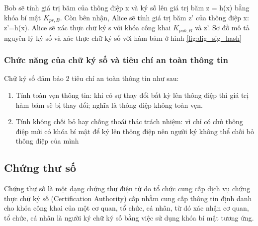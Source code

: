 Bob sẽ tính giá trị băm của thông điệp x và ký số lên giá trị băm z = h(x) bằng khóa bí mật $K_{pr,B}$. Còn bên nhận, Alice sẽ tính giá trị băm z’ của thông điệp x: z’=h(x). Alice sẽ xác thực chữ ký s với khóa công khai $K_{pub,B}$ và z’. Sơ đồ mô tả nguyên lý ký số và xác thực chữ ký số với hàm băm ở hình \ref{fig:dig_sig_hash}

\subsubsection{Chức năng của chữ ký số và tiêu chí an toàn thông tin}
Chữ ký số đảm bảo 2 tiêu chí an toàn thông tin như sau:
\begin{enumerate}
\item Tính toàn vẹn thông tin: khi có sự thay đổi bất kỳ lên thông điệp thì giá trị hàm băm sẽ bị thay đổi; nghĩa là thông điệp không toàn vẹn.
\item Tính không chối bỏ hay chống thoái thác trách nhiệm: vì chỉ có chủ thông điệp mới có khóa bí mật để ký lên thông điệp nên người ký không thể chối bỏ thông điệp của mình
\end{enumerate}

\subsection{Chứng thư số}

Chứng thư số là một dạng chứng thư điện tử do tổ chức cung cấp dịch vụ chứng thực chữ ký số (Certification Authority) cấp nhằm cung cấp thông tin định danh cho khóa công khai của một cơ quan, tổ chức, cá nhân, từ đó xác nhận cơ quan, tổ chức, cá nhân là người ký chữ ký số bằng việc sử dụng khóa bí mật tương ứng. 


